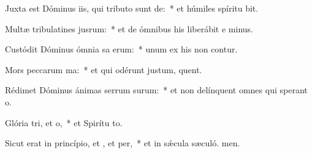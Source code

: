 \item Juxta est Dóminus iis, qui tributo sunt de:~* et húmiles spíritu bit.
\item Multæ tribulatines jusrum:~* et de ómnibus his liberábit e minus.
\item Custódit Dóminus ómnia sa erum:~* unum ex his non contur.
\item Mors peccarum ma:~* et qui odérunt justum, quent.
\item Rédimet Dóminus ánimas serrum surum:~* et non delínquent omnes qui sperant  o.
\item Glória tri, et o,~* et Spirítu to.
\item Sicut erat in princípio, et , et per,~* et in sǽcula sæculó. men.
